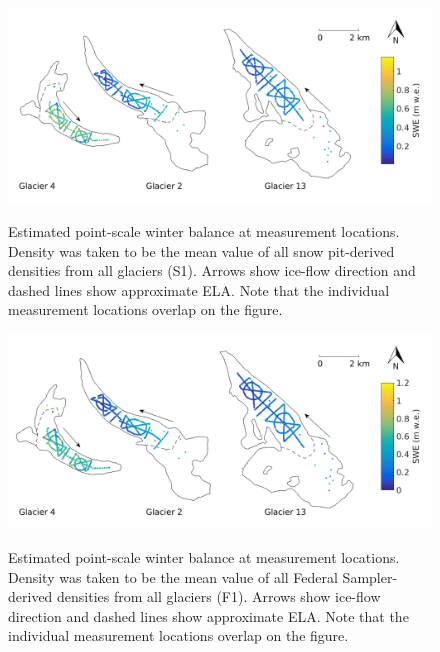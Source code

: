 \documentclass{sfuthesis}
\begin{document}
\begin{figure}[H]
	\centering
	\includegraphics[width = \textwidth]{SWEmap_opt2.png}\\
	\caption{Estimated point-scale winter balance at measurement locations. Density was taken to be the mean value of all snow pit-derived densities from all glaciers (S1). Arrows show ice-flow direction and dashed lines show approximate ELA. Note that the individual measurement locations overlap on the figure.}
	\label{fig:SWEmap_S1}
\end{figure}

\begin{figure}[H]
	\centering
	\includegraphics[width = \textwidth]{SWEmap_opt3.png}\\
	\caption{Estimated point-scale winter balance at measurement locations. Density was taken to be the mean value of all Federal Sampler-derived densities from all glaciers (F1). Arrows show ice-flow direction and dashed lines show approximate ELA. Note that the individual measurement locations overlap on the figure.}
	\label{fig:SWEmap_F1}
\end{figure}
\end{document}
